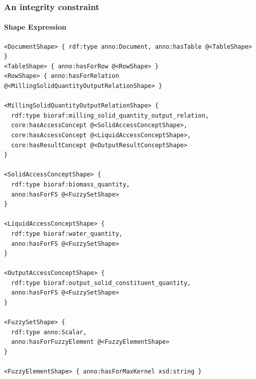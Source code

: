 \documentclass{beamer}
\begin{document}
\begin{frame}[fragile]
  \frametitle{An integrity constraint}
  \framesubtitle{Shape Expression}

  \begin{Verbatim}[fontsize=\tiny]
<DocumentShape> { rdf:type anno:Document, anno:hasTable @<TableShape> }
<TableShape> { anno:hasForRow @<RowShape> }
<RowShape> { anno:hasForRelation @<MillingSolidQuantityOutputRelationShape> }

<MillingSolidQuantityOutputRelationShape> {
  rdf:type bioraf:milling_solid_quantity_output_relation,
  core:hasAccessConcept @<SolidAccessConceptShape>,
  core:hasAccessConcept @<LiquidAccessConceptShape>,
  core:hasResultConcept @<OutputResultConceptShape>
}

<SolidAccessConceptShape> {
  rdf:type bioraf:biomass_quantity,
  anno:hasForFS @<FuzzySetShape>
}

<LiquidAccessConceptShape> {
  rdf:type bioraf:water_quantity,
  anno:hasForFS @<FuzzySetShape>
}

<OutputAccessConceptShape> {
  rdf:type bioraf:output_solid_constituent_quantity,
  anno:hasForFS @<FuzzySetShape>
}

<FuzzySetShape> {
  rdf:type anno:Scalar,
  anno:hasForFuzzyElement @<FuzzyElementShape>
}

<FuzzyElementShape> { anno:hasForMaxKernel xsd:string }
  \end{Verbatim}
\end{frame}
\end{document}
